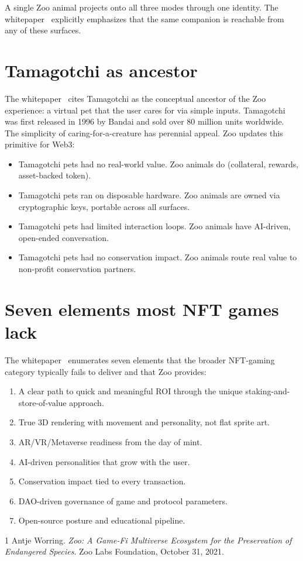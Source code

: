\documentclass[11pt,letterpaper]{article}
\begin{document}
A single Zoo animal projects onto all three modes through one identity. The whitepaper~\cite{zoo2021} explicitly emphasizes that the same companion is reachable from any of these surfaces.

\section{Tamagotchi as ancestor}

The whitepaper~\cite{zoo2021} cites Tamagotchi as the conceptual ancestor of the Zoo experience: a virtual pet that the user cares for via simple inputs. Tamagotchi was first released in 1996 by Bandai and sold over 80 million units worldwide. The simplicity of caring-for-a-creature has perennial appeal. Zoo updates this primitive for Web3:

\begin{itemize}
  \item Tamagotchi pets had no real-world value. Zoo animals do (collateral, rewards, asset-backed token).
  \item Tamagotchi pets ran on disposable hardware. Zoo animals are owned via cryptographic keys, portable across all surfaces.
  \item Tamagotchi pets had limited interaction loops. Zoo animals have AI-driven, open-ended conversation.
  \item Tamagotchi pets had no conservation impact. Zoo animals route real value to non-profit conservation partners.
\end{itemize}

\section{Seven elements most NFT games lack}

The whitepaper~\cite{zoo2021} enumerates seven elements that the broader NFT-gaming category typically fails to deliver and that Zoo provides:

\begin{enumerate}
  \item A clear path to quick and meaningful ROI through the unique staking-and-store-of-value approach.
  \item True 3D rendering with movement and personality, not flat sprite art.
  \item AR/VR/Metaverse readiness from the day of mint.
  \item AI-driven personalities that grow with the user.
  \item Conservation impact tied to every transaction.
  \item DAO-driven governance of game and protocol parameters.
  \item Open-source posture and educational pipeline.
\end{enumerate}

\begin{thebibliography}{1}
 Antje Worring. \emph{Zoo: A Game-Fi Multiverse Ecosystem for the Preservation of Endangered Species}. Zoo Labs Foundation, October 31, 2021.
\end{thebibliography}
\end{document}
